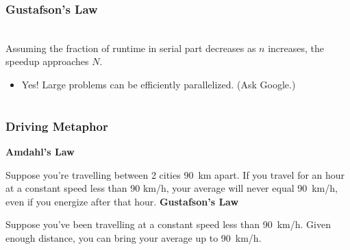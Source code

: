 \documentclass[aspectratio=43]{beamer}
\begin{document}
\begin{frame}
  \frametitle{Gustafson's Law}

\hspace*{2em}\begin{minipage}{.8\textwidth}
  \\[1em]

  Assuming the fraction of runtime in serial part decreases as $n$ increases,
  the speedup approaches $N$.

  \begin{itemize}
    \item Yes! Large problems can be efficiently parallelized. (Ask Google.)
  \end {itemize}
\end{minipage}
\end{frame}

\section{}
\begin{frame}
  \frametitle{Driving Metaphor}

  {\bf Amdahl's Law}
  
  Suppose you're travelling between 2 cities 90~km apart. If you travel for an
  hour at a constant speed less than 90 km/h, your average will never equal
  90~km/h, even if you energize after that hour.
  \vfill
  {\bf Gustafson's Law}

  Suppose you've been travelling at a constant speed less than 90~km/h. Given
  enough distance, you can bring your average up to 90~km/h.
\end{frame}
\end{document}
